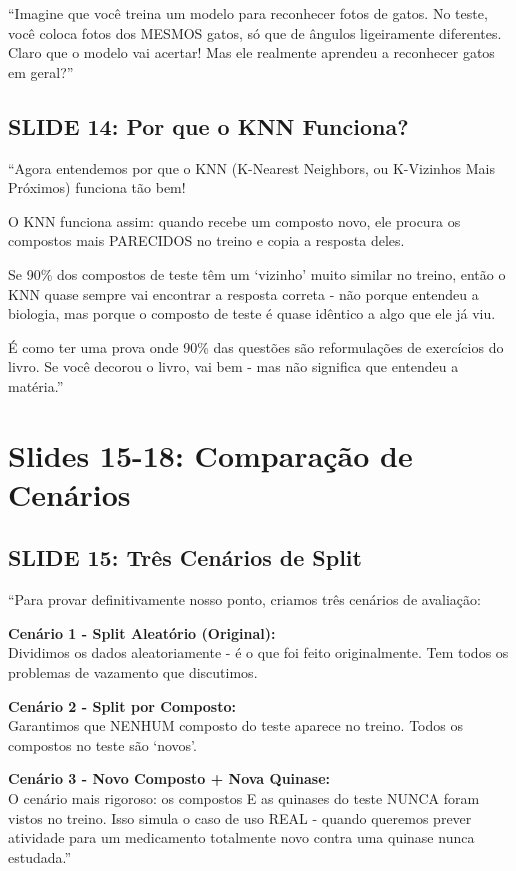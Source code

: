 \documentclass[11pt,a4paper]{article}
\begin{document}
\begin{analogia}
``Imagine que você treina um modelo para reconhecer fotos de gatos. No teste, você coloca fotos dos MESMOS gatos, só que de ângulos ligeiramente diferentes. Claro que o modelo vai acertar! Mas ele realmente aprendeu a reconhecer gatos em geral?''
\end{analogia}

\subsection{SLIDE 14: Por que o KNN Funciona?}

\begin{oquedizer}
``Agora entendemos por que o KNN (K-Nearest Neighbors, ou K-Vizinhos Mais Próximos) funciona tão bem!

O KNN funciona assim: quando recebe um composto novo, ele procura os compostos mais PARECIDOS no treino e copia a resposta deles.

Se 90\% dos compostos de teste têm um `vizinho' muito similar no treino, então o KNN quase sempre vai encontrar a resposta correta - não porque entendeu a biologia, mas porque o composto de teste é quase idêntico a algo que ele já viu.

É como ter uma prova onde 90\% das questões são reformulações de exercícios do livro. Se você decorou o livro, vai bem - mas não significa que entendeu a matéria.''
\end{oquedizer}

\section{Slides 15-18: Comparação de Cenários}

\subsection{SLIDE 15: Três Cenários de Split}

\begin{oquedizer}
``Para provar definitivamente nosso ponto, criamos três cenários de avaliação:

\textbf{Cenário 1 - Split Aleatório (Original):}\\
Dividimos os dados aleatoriamente - é o que foi feito originalmente. Tem todos os problemas de vazamento que discutimos.

\textbf{Cenário 2 - Split por Composto:}\\
Garantimos que NENHUM composto do teste aparece no treino. Todos os compostos no teste são `novos'.

\textbf{Cenário 3 - Novo Composto + Nova Quinase:}\\
O cenário mais rigoroso: os compostos E as quinases do teste NUNCA foram vistos no treino. Isso simula o caso de uso REAL - quando queremos prever atividade para um medicamento totalmente novo contra uma quinase nunca estudada.''
\end{oquedizer}
\end{document}
